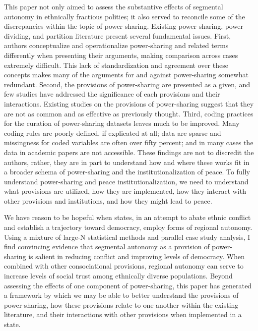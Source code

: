 \documentclass[12pt]{article}
\begin{document}
This paper not only aimed to assess the substantive effects of segmental autonomy in ethnically fractious polities; it also served to reconcile some of the discrepancies within the topic of power-sharing. Existing power-sharing, power-dividing, and partition literature present several fundamental issues. First, authors conceptualize and operationalize power-sharing and related terms differently when presenting their arguments, making comparison across cases extremely difficult. This lack of standardization and agreement over these concepts makes many of the arguments for and against power-sharing somewhat redundant. Second, the provisions of power-sharing are presented as a given, and few studies have addressed the significance of each provisions and their interactions. Existing studies on the provisions of power-sharing suggest that they are not as common and as effective as previously thought. Third, coding practices for the curation of power-sharing datasets leaves much to be improved. Many coding rules are poorly defined, if explicated at all; data are sparse and missingness for coded variables are often over fifty percent; and in many cases the data in academic papers are not accessible. These findings are not to discredit the authors, rather, they are in part to understand how and where these works fit in a broader schema of power-sharing and the institutionalization of peace. To fully understand power-sharing and peace institutionalization, we need to understand what provisions are utilized, how they are implemented, how they interact with other provisions and institutions, and how they might lead to peace.

We have reason to be hopeful when states, in an attempt to abate ethnic conflict and establish a trajectory toward democracy, employ forms of regional autonomy. Using a mixture of large-N statistical methods and parallel case study analysis, I find convincing evidence that segmental autonomy as a provision of power-sharing is salient in reducing conflict and improving levels of democracy. When combined with other consociational provisions, regional autonomy can serve to increase levels of social trust among ethnically diverse populations. Beyond assessing the effects of one component of power-sharing, this paper has generated a framework by which we may be able to better understand the provisions of power-sharing, how these provisions relate to one another within the existing literature, and their interactions with other provisions when implemented in a state.

\pagebreak
\end{document}
